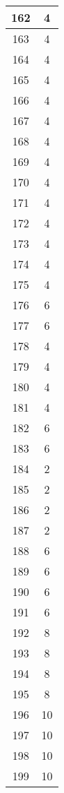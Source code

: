 \documentclass[letterpaper, 12pt]{article}
\begin{document}
\begin{longtable}{|c|c|}
\hline
162 & 4 \\
\hline
163 & 4 \\
\hline
164 & 4 \\
\hline
165 & 4 \\
\hline
166 & 4 \\
\hline
167 & 4 \\
\hline
168 & 4 \\
\hline
169 & 4 \\
\hline
170 & 4 \\
\hline
171 & 4 \\
\hline
172 & 4 \\
\hline
173 & 4 \\
\hline
174 & 4 \\
\hline
175 & 4 \\
\hline
176 & 6 \\
\hline
177 & 6 \\
\hline
178 & 4 \\
\hline
179 & 4 \\
\hline
180 & 4 \\
\hline
181 & 4 \\
\hline
182 & 6 \\
\hline
183 & 6 \\
\hline
184 & 2 \\
\hline
185 & 2 \\
\hline
186 & 2 \\
\hline
187 & 2 \\
\hline
188 & 6 \\
\hline
189 & 6 \\
\hline
190 & 6 \\
\hline
191 & 6 \\
\hline
192 & 8 \\
\hline
193 & 8 \\
\hline
194 & 8 \\
\hline
195 & 8 \\
\hline
196 & 10 \\
\hline
197 & 10 \\
\hline
198 & 10 \\
\hline
199 & 10 \\
\hline
\end{longtable}
\end{document}
